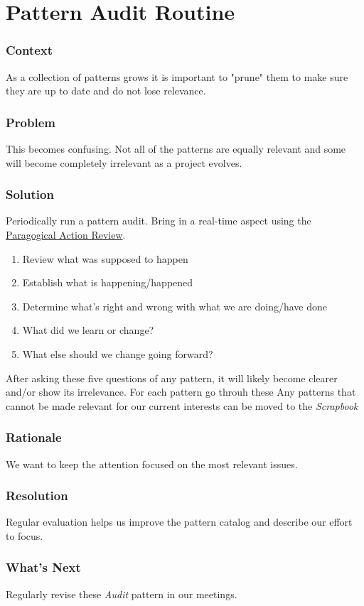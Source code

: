 \section{Pattern Audit Routine}\label{sec:Pattern_Audit_Routine}

\subsubsection*{Context} As a collection of patterns grows it is important to "prune" them to make sure they are up to date and do not lose relevance.

\subsubsection*{Problem} This becomes confusing. Not all of the patterns are equally relevant and some will become completely irrelevant as a project evolves.

\subsubsection*{Solution} Periodically run a pattern audit. Bring in a real-time aspect using the \href{http://metameso.org/~joe/docs/The-Paragogical-Action-Review.pdf}{Paragogical Action Review}. 

\begin{enumerate}
\item Review what was supposed to happen
\item Establish what is happening/happened
\item Determine what’s right and wrong with what we are doing/have done
\item What did we learn or change?
\item What else should we change going forward?
\end{enumerate}

After asking these five questions of any pattern, it will likely become clearer and/or show its irrelevance. For each pattern go throuh these Any patterns that cannot be made relevant for our current interests can be moved to the \emph{Scrapbook}

\subsubsection*{Rationale} We want to keep the attention focused on the most relevant issues.

\subsubsection*{Resolution} Regular evaluation helps us improve the pattern catalog and describe our effort to focus.

\subsubsection*{What's Next} Regularly revise these \emph{Audit} pattern in our meetings.